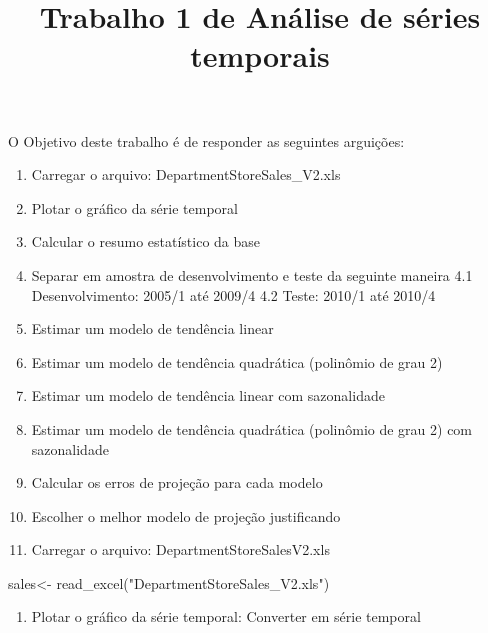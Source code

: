 \documentclass[
]{article}
\title{Trabalho 1 de Análise de séries temporais}
\author{}
\date{\vspace{-2.5em}}
\newenvironment{Shaded}{\begin{snugshade}}{\end{snugshade}}
\newcommand{\AttributeTok}[1]{\textcolor[rgb]{0.77,0.63,0.00}{#1}}
\newcommand{\DecValTok}[1]{\textcolor[rgb]{0.00,0.00,0.81}{#1}}
\newcommand{\FunctionTok}[1]{\textcolor[rgb]{0.00,0.00,0.00}{#1}}
\newcommand{\NormalTok}[1]{#1}
\newcommand{\OtherTok}[1]{\textcolor[rgb]{0.56,0.35,0.01}{#1}}
\newcommand{\SpecialCharTok}[1]{\textcolor[rgb]{0.00,0.00,0.00}{#1}}
\newcommand{\StringTok}[1]{\textcolor[rgb]{0.31,0.60,0.02}{#1}}
\providecommand{\tightlist}{%
  \setlength{\itemsep}{0pt}\setlength{\parskip}{0pt}}
\begin{document}
\maketitle

O Objetivo deste trabalho é de responder as seguintes arguições:

\begin{enumerate}
\def\labelenumi{\arabic{enumi}.}
\item
  Carregar o arquivo: DepartmentStoreSales\_V2.xls
\item
  Plotar o gráfico da série temporal
\item
  Calcular o resumo estatístico da base
\item
  Separar em amostra de desenvolvimento e teste da seguinte maneira 4.1
  Desenvolvimento: 2005/1 até 2009/4 4.2 Teste: 2010/1 até 2010/4
\item
  Estimar um modelo de tendência linear
\item
  Estimar um modelo de tendência quadrática (polinômio de grau 2)
\item
  Estimar um modelo de tendência linear com sazonalidade
\item
  Estimar um modelo de tendência quadrática (polinômio de grau 2) com
  sazonalidade
\item
  Calcular os erros de projeção para cada modelo
\item
  Escolher o melhor modelo de projeção justificando
\item
  Carregar o arquivo: DepartmentStoreSalesV2.xls
\end{enumerate}

\begin{Shaded}
\begin{Highlighting}[]
\NormalTok{sales}\OtherTok{\textless{}{-}} \FunctionTok{read\_excel}\NormalTok{(}\StringTok{"DepartmentStoreSales\_V2.xls"}\NormalTok{)}
\end{Highlighting}
\end{Shaded}

\begin{enumerate}
\def\labelenumi{\arabic{enumi}.}
\setcounter{enumi}{1}
\tightlist
\item
  Plotar o gráfico da série temporal: Converter em série temporal
\end{enumerate}

\begin{Shaded}
\end{Shaded}
\end{document}
